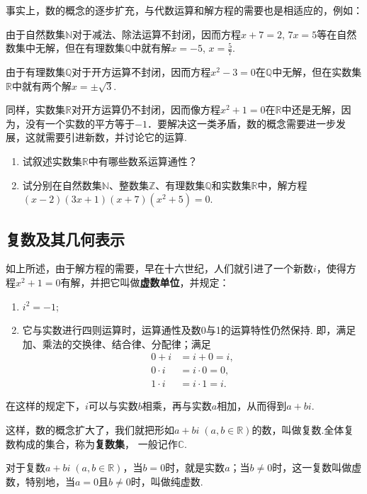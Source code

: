 事实上，数的概念的逐步扩充，与代数运算和解方程的需要也是相适应的，例如：

由于自然数集$\mathbb{N}$对于减法、除法运算不封闭，因而方程$x+7=2$, $7x=5$等在自然数集中无解，但在有理数集$\mathbb{Q}$中就有解$x=-5$, $x=\frac{5}{7}$. 

由于有理数集$\mathbb{Q}$对于开方运算不封闭，因而方程$x^2-3
=0$在$\mathbb{Q}$中无解，但在实数集$\mathbb{R}$中就有两个解$x=\pm\sqrt{3}$.

同样，实数集$\mathbb{R}$对开方运算仍不封闭，因而像方程$x^2+1=0$在$\mathbb{R}$中还是无解，因为，没有一个实数的平方等于$-1$．要解决这一类矛盾，数的概念需要进一步发展，这就需要引进新数，并讨论它的运算.

\begin{ex}
\begin{enumerate}
    \item 试叙述实数集$\mathbb{R}$中有哪些数系运算通性？
\item 试分别在自然数集$\mathbb{N}$、整数集$\mathbb{Z}$、有理数集$\mathbb{Q}$和实数集$\mathbb{R}$中，解方程$(x-2)(3x+1)(x+7)(x^2+5)=0$.
\end{enumerate}
\end{ex}

\subsection{复数及其几何表示}
如上所述，由于解方程的需要，早在十六世纪，人们就引进了一个新数$i$，使得方程$x^2+1=0$有解，并把它叫做\textbf{虚数单位}，并规定：
\begin{enumerate}[(1)]
\item $i^2=-1$;
\item 它与实数进行四则运算时，运算通性及数0与1的运算特性仍然保持. 即，满足加、乘法的交换律、结合律、分配律；满足
\[\begin{split}
    0+i&=i+0=i,\\
0\cdot i&=i\cdot 0=0,\\
1\cdot i&=i\cdot 1=i.
\end{split}\]
\end{enumerate}

在这样的规定下，$i$可以与实数$b$相乘，再与实数$a$相加，从而得到$a+bi$.

这样，数的概念扩大了，我们就把形如$a+bi\; (a,b\in\mathbb{R})$的数，叫做复数.全体复数构成的集合，称为\textbf{复数集}，
一般记作$\mathbb{C}$.

对于复数$a+bi\; (a,b\in\mathbb{R})$，当$b=0$时，就是实数$a$；当$b\ne 0$时，这一复数叫做虚数，特别地，当$a=0$且$b\ne 0$时，叫做纯虚数.

